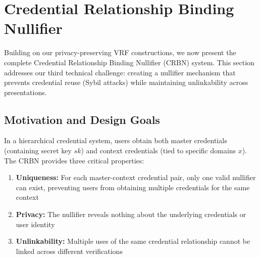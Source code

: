 \section{Credential Relationship Binding Nullifier}\label{sec:crbn}

Building on our privacy-preserving VRF constructions, we now present the complete Credential Relationship Binding Nullifier (CRBN) system. This section addresses our third technical challenge: creating a nullifier mechanism that prevents credential reuse (Sybil attacks) while maintaining unlinkability across presentations.

\subsection{Motivation and Design Goals}

In a hierarchical credential system, users obtain both master credentials (containing secret key $sk$) and context credentials (tied to specific domains $x$). The CRBN provides three critical properties:

\begin{enumerate}
    \item \textbf{Uniqueness:} For each master-context credential pair, only one valid nullifier can exist, preventing users from obtaining multiple credentials for the same context
    \item \textbf{Privacy:} The nullifier reveals nothing about the underlying credentials or user identity
    \item \textbf{Unlinkability:} Multiple uses of the same credential relationship cannot be linked across different verifications
\end{enumerate}


